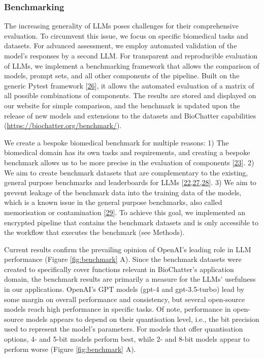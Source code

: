 \hypertarget{benchmarking}{%
\subsubsection{Benchmarking}\label{benchmarking}}

The increasing generality of LLMs poses challenges for their comprehensive evaluation.
To circumvent this issue, we focus on specific biomedical tasks and datasets.
For advanced assessment, we employ automated validation of the model's responses by a second LLM.
For transparent and reproducible evaluation of LLMs, we implement a benchmarking framework that allows the comparison of models, prompt sets, and all other components of the pipeline.
Built on the generic Pytest framework {[}\protect\hyperlink{ref-14upAJPXR}{26}{]}, it allows the automated evaluation of a matrix of all possible combinations of components.
The results are stored and displayed on our website for simple comparison, and the benchmark is updated upon the release of new models and extensions to the datasets and BioChatter capabilities (\url{https://biochatter.org/benchmark/}).

We create a bespoke biomedical benchmark for multiple reasons:
1) The biomedical domain has its own tasks and requirements, and creating a bespoke benchmark allows us to be more precise in the evaluation of components {[}\protect\hyperlink{ref-uYvzQA7w}{23}{]}.
2) We aim to create benchmark datasets that are complementary to the existing, general purpose benchmarks and leaderboards for LLMs {[}\protect\hyperlink{ref-LE2GwIqT}{22},\protect\hyperlink{ref-KONKs6Pw}{27},\protect\hyperlink{ref-foK1oImy}{28}{]}.
3) We aim to prevent leakage of the benchmark data into the training data of the models, which is a known issue in the general purpose benchmarks, also called memorisation or contamination {[}\protect\hyperlink{ref-yT66jV6G}{29}{]}.
To achieve this goal, we implemented an encrypted pipeline that contains the benchmark datasets and is only accessible to the workflow that executes the benchmark (see Methods).

Current results confirm the prevailing opinion of OpenAI's leading role in LLM performance (Figure \ref{fig:benchmark} A).
Since the benchmark datasets were created to specifically cover functions relevant in BioChatter's application domain, the benchmark results are primarily a measure for the LLMs' usefulness in our applications.
OpenAI's GPT models (gpt-4 and gpt-3.5-turbo) lead by some margin on overall performance and consistency, but several open-source models reach high performance in specific tasks.
Of note, performance in open-source models appears to depend on their quantisation level, i.e., the bit precision used to represent the model's parameters.
For models that offer quantisation options, 4- and 5-bit models perform best, while 2- and 8-bit models appear to perform worse (Figure \ref{fig:benchmark} A).

